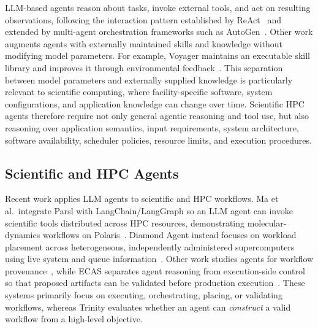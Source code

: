 \documentclass[conference]{IEEEtran}
\begin{document}
LLM-based agents reason about tasks, invoke external tools, and act on resulting observations, following the interaction pattern established by ReAct~\cite{yao2023react} and extended by multi-agent orchestration frameworks such as AutoGen~\cite{wu2024autogen}. Other work augments agents with externally maintained skills and knowledge without modifying model parameters. For example, Voyager maintains an executable skill library and improves it through environmental feedback~\cite{wang2023voyager}. This separation between model parameters and externally supplied knowledge is particularly relevant to scientific computing, where facility-specific software, system configurations, and application knowledge can change over time. Scientific HPC agents therefore require not only general agentic reasoning and tool use, but also reasoning over application semantics, input requirements, system architecture, software availability, scheduler policies, resource limits, and execution procedures.

\subsection{Scientific and HPC Agents}

Recent work applies LLM agents to scientific and HPC workflows. Ma et al.\ integrate Parsl with LangChain/LangGraph so an LLM agent can invoke scientific tools distributed across HPC resources, demonstrating molecular-dynamics workflows on Polaris~\cite{ma2025langchainparsl}. Diamond Agent instead focuses on workload placement across heterogeneous, independently administered supercomputers using live system and queue information~\cite{diamondagent2026}. Other work studies agents for workflow provenance~\cite{souza2025provenance}, while ECAS separates agent reasoning from execution-side control so that proposed artifacts can be validated before production execution~\cite{sun2026ecas}. These systems primarily focus on executing, orchestrating, placing, or validating workflows, whereas Trinity evaluates whether an agent can \textit{construct} a valid workflow from a high-level objective.
\end{document}
